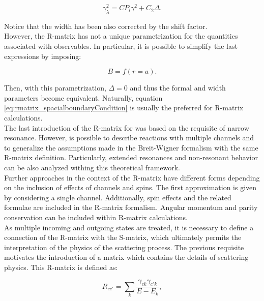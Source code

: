 \documentclass[openany]{book}
\begin{document}
\begin{equation}   \label{eq:rmatrix_reducedWidth_formal}
	\gamma^2_\lambda =C P_l\gamma^2 + C_2 \Delta.
\end{equation}

Notice that the width has been also corrected by the shift factor. \\

However, the R-matrix has not a unique parametrization for the quantities associated with observables. In particular, it is possible to simplify the last expressions by imposing: 

\begin{equation}  \label{eq:rmatrix_spacialboundaryCondition}
	B = f(r = a). 
\end{equation}

Then, with this parametrization, $\Delta = 0$ and thus the formal and width parameters become equivalent. Naturally, equation \ref{eq:rmatrix_spacialboundaryCondition} is usually  the preferred for R-matrix calculations. \\

The last introduction of the R-matrix for was based on the requisite of narrow resonance. However,  is possible to describe reactions with multiple channels and to generalize the assumptions made in the Breit-Wigner formalism with the same R-matrix definition. Particularly, extended resonances and non-resonant behavior can be also analyzed withing this theoretical framework.\\

Further approaches in the context of the R-matrix have different forms depending on the inclusion of effects of channels and spins. The first approximation is given by considering a single channel. Additionally, spin effects and the related formulae are included in the R-matrix formalism. Angular momentum and parity conservation can be included within R-matrix calculations. \\

As multiple incoming and outgoing states are treated, it is necessary to define a connection of the R-matrix with the S-matrix, which ultimately permits the interpretation of the physics of the scattering process. The previous requisite motivates the introduction of a matrix which contains the details of scattering physics. This R-matrix is defined as:

\begin{equation}  \label{eq:rmatrix_elements}
	R_{cc'} = \sum_k {\frac{\gamma_{ck} \gamma_{c'k}}{E - E_k}}, 
\end{equation}
\end{document}
